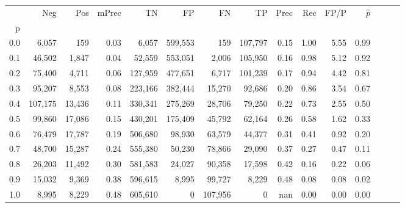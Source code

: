 \begin{tabular}{rrrrrrrrrrrrrrr}
\toprule
{} &      Neg &     Pos & mPrec &       TN &       FP &       FN &       TP &  Prec &   Rec &  FP/P & $\hat{p}$ \\
p   &          &         &       &          &          &          &          &       &       &       &           \\
\midrule
0.0 &    6,057 &     159 &  0.03 &    6,057 &  599,553 &      159 &  107,797 &  0.15 &  1.00 &  5.55 &      0.99 \\
0.1 &   46,502 &   1,847 &  0.04 &   52,559 &  553,051 &    2,006 &  105,950 &  0.16 &  0.98 &  5.12 &      0.92 \\
0.2 &   75,400 &   4,711 &  0.06 &  127,959 &  477,651 &    6,717 &  101,239 &  0.17 &  0.94 &  4.42 &      0.81 \\
0.3 &   95,207 &   8,553 &  0.08 &  223,166 &  382,444 &   15,270 &   92,686 &  0.20 &  0.86 &  3.54 &      0.67 \\
0.4 &  107,175 &  13,436 &  0.11 &  330,341 &  275,269 &   28,706 &   79,250 &  0.22 &  0.73 &  2.55 &      0.50 \\
0.5 &   99,860 &  17,086 &  0.15 &  430,201 &  175,409 &   45,792 &   62,164 &  0.26 &  0.58 &  1.62 &      0.33 \\
0.6 &   76,479 &  17,787 &  0.19 &  506,680 &   98,930 &   63,579 &   44,377 &  0.31 &  0.41 &  0.92 &      0.20 \\
0.7 &   48,700 &  15,287 &  0.24 &  555,380 &   50,230 &   78,866 &   29,090 &  0.37 &  0.27 &  0.47 &      0.11 \\
0.8 &   26,203 &  11,492 &  0.30 &  581,583 &   24,027 &   90,358 &   17,598 &  0.42 &  0.16 &  0.22 &      0.06 \\
0.9 &   15,032 &   9,369 &  0.38 &  596,615 &    8,995 &   99,727 &    8,229 &  0.48 &  0.08 &  0.08 &      0.02 \\
1.0 &    8,995 &   8,229 &  0.48 &  605,610 &        0 &  107,956 &        0 &   nan &  0.00 &  0.00 &      0.00 \\
\bottomrule
\end{tabular}
